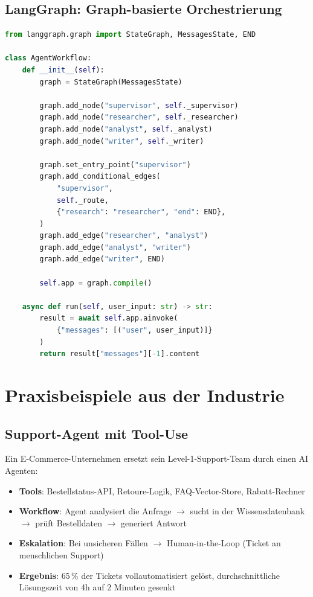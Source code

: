 \subsection{LangGraph: Graph-basierte Orchestrierung}

\begin{lstlisting}[language=Python, caption=Multi-Agent-Workflow mit LangGraph]
from langgraph.graph import StateGraph, MessagesState, END

class AgentWorkflow:
    def __init__(self):
        graph = StateGraph(MessagesState)

        graph.add_node("supervisor", self._supervisor)
        graph.add_node("researcher", self._researcher)
        graph.add_node("analyst", self._analyst)
        graph.add_node("writer", self._writer)

        graph.set_entry_point("supervisor")
        graph.add_conditional_edges(
            "supervisor",
            self._route,
            {"research": "researcher", "end": END},
        )
        graph.add_edge("researcher", "analyst")
        graph.add_edge("analyst", "writer")
        graph.add_edge("writer", END)

        self.app = graph.compile()

    async def run(self, user_input: str) -> str:
        result = await self.app.ainvoke(
            {"messages": [("user", user_input)]}
        )
        return result["messages"][-1].content
\end{lstlisting}

\section{Praxisbeispiele aus der Industrie}

\subsection{Support-Agent mit Tool-Use}

Ein E-Commerce-Unternehmen ersetzt sein Level-1-Support-Team durch einen AI Agenten:

\begin{itemize}[leftmargin=*]
    \item \textbf{Tools}: Bestellstatus-API, Retoure-Logik, FAQ-Vector-Store, Rabatt-Rechner
    \item \textbf{Workflow}: Agent analysiert die Anfrage $\rightarrow$ sucht in der Wissensdatenbank $\rightarrow$ prüft Bestelldaten $\rightarrow$ generiert Antwort
    \item \textbf{Eskalation}: Bei unsicheren Fällen $\rightarrow$ Human-in-the-Loop (Ticket an menschlichen Support)
    \item \textbf{Ergebnis}: 65\,\% der Tickets vollautomatisiert gelöst, durchschnittliche Lösungszeit von 4h auf 2 Minuten gesenkt
\end{itemize}

